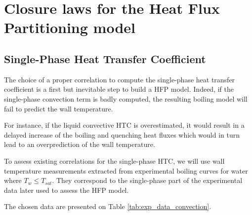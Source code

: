 
\chapter{Closure laws for the Heat Flux Partitioning model} %

\label{ch:HFP_closures} %


\minitoc


\section{Single-Phase Heat Transfer Coefficient}
\label{sec:single_phase_HTC}

The choice of a proper correlation to compute the single-phase heat transfer coefficient is a first but inevitable step to build a HFP model. Indeed, if the single-phase convection term is badly computed, the resulting boiling model will fail to predict the wall temperature.

For instance, if the liquid convective HTC is overestimated, it would result in a delayed increase of the boiling and quenching heat fluxes which would in turn lead to an overprediction of the wall temperature. 

To assess existing correlations for the single-phase HTC, we will use wall temperature measurements extracted from experimental boiling curves for water where $T_{w}\leq T_{sat}$. They correspond to the single-phase part of the experimental data later used to assess the HFP model.

The chosen data are presented on Table \ref{tab:exp_data_convection}.

